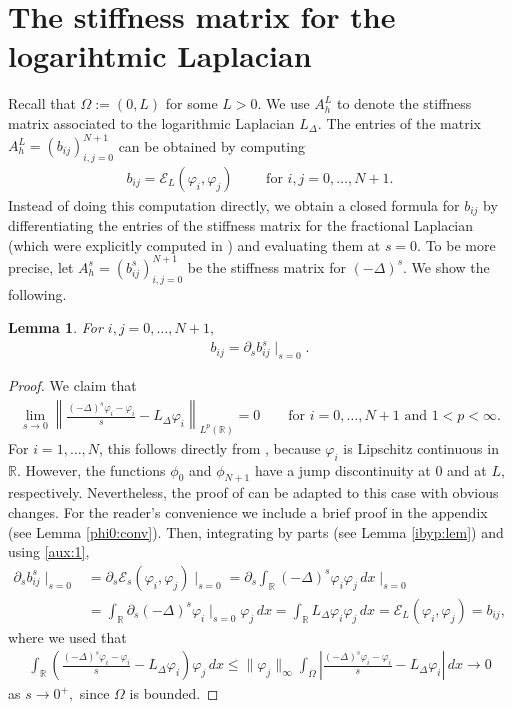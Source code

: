 \documentclass[11 pt]{article}
\newtheorem{lemma}[theorem]{Lemma}
\numberwithin{equation}{section}
\def\R{\mathbb{R}}
\def\cE{\mathcal{E}}
\begin{document}
\section{The stiffness matrix for the logarihtmic Laplacian}

Recall that $\Omega:=(0,L)$ for some $L>0$.  We use $A^L_h$ to denote the stiffness matrix associated to the logarithmic Laplacian $L_\Delta.$   The entries of the matrix $A^L_h=(b_{ij})_{i,j=0}^{N+1}$ can be obtained by computing
\begin{align*}
b_{ij}=\cE_L(\varphi_i,\varphi_j)\qquad \text{ for }i,j=0,\ldots,N+1.
\end{align*}
Instead of doing this computation directly, we obtain a closed formula for $b_{ij}$ by differentiating the entries of the stiffness matrix for the fractional Laplacian (which were explicitly computed in \cite{BH17}) and evaluating them at $s=0$.  To be more precise, let $A^s_h=(b_{ij}^s)_{i,j=0}^{N+1}$ be the stiffness matrix for $(-\Delta)^s$. We show the following. 
\begin{lemma}\label{lem:derivative:s:m} For $i,j=0,\ldots,N+1,$
\begin{align*}
    b_{ij}=\partial_s b_{ij}^s \mid_{s=0}.
\end{align*}
\end{lemma}
\begin{proof}
We claim that 
\begin{align}\label{aux:1}
\lim_{s\to 0}\left\|\frac{(-\Delta)^s \varphi_i-\varphi_i}{s}-L_\Delta \varphi_i    \right\|_{L^p(\R)}=0\qquad \text{for $i=0,\ldots,N+1$ and $1<p<\infty$.}
\end{align}
For $i=1,\ldots,N$, this follows directly from \cite[Theorem 1.1]{CW19}, because $\varphi_i$ is Lipschitz continuous in $\R$.  However, the functions $\phi_0$ and $\phi_{N+1}$ have a jump discontinuity at 0 and at $L$, respectively.  Nevertheless, the proof of \cite[Theorem 1.1]{CW19} can be adapted to this case with obvious changes.  For the reader's convenience we include a brief proof in the appendix (see Lemma \ref{phi0:conv}). Then, integrating by parts (see Lemma \ref{ibyp:lem}) and using \eqref{aux:1},
\begin{align*}
\partial_s b_{ij}^s\mid_{s=0}&=\partial_s\cE_s(\varphi_i,\varphi_j)\mid_{s=0}=
\partial_s\int_{\R} (-\Delta)^s\varphi_i \varphi_j\, dx\mid_{s=0}\\
&=\int_{\R} \partial_s(-\Delta)^s\varphi_i\mid_{s=0} \varphi_j\, dx
=\int_{\R} L_\Delta\varphi_i \varphi_j\, dx
=\cE_L(\varphi_i,\varphi_j)=b_{ij},
\end{align*}
where we used that
\begin{align*}
\int_{\R}\left(\frac{(-\Delta)^s \varphi_i-\varphi_i}{s}-L_\Delta \varphi_i  \right)\varphi_j\, dx
\leq \|\varphi_j\|_\infty\int_{\Omega}\left|\frac{(-\Delta)^s \varphi_i-\varphi_i}{s}-L_\Delta \varphi_i  \right|\, dx\to 0
\end{align*}
as $s\to 0^+,$ since $\Omega$ is bounded.
\end{proof}
\end{document}

